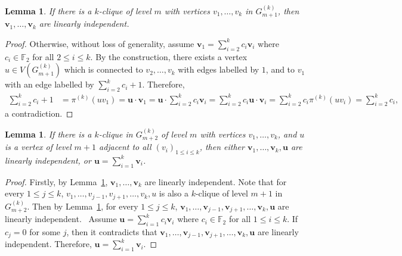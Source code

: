 \documentclass[
final
]{dmtcs-episciences}
\newtheorem{lemma}[theorem]{Lemma}
\begin{document}
\begin{lemma}\label{lemma: clique independence}
    If there is a $k$-clique of level $m$ with vertices $v_1, \ldots, v_k$ in $G^{(k)}_{m+1}$, then $\mathbf{v}_1, \ldots, \mathbf{v}_k$ are linearly independent.
\end{lemma}

\begin{proof}
    Otherwise, without loss of generality, assume $\mathbf{v}_1 = \sum_{i=2}^{k} c_i \mathbf{v}_i$ where $c_i \in \mathbb{F}_2$ for all $ 2 \le i \le k$. By the construction,
    there exists a vertex $u \in V(G^{(k)}_{m+1})$ which is connected to $v_2,\ldots, v_k$ with edges labelled by $1$, and to $v_1$ with an edge labelled by $\sum_{i=2}^{k}c_i + 1$.
    Therefore,
    \begin{equation*}
    \begin{aligned}
       \sum_{i=2}^{k}c_i + 1   & =  \pi^{(k)}(uv_1) = \mathbf{u} \cdot \mathbf{v}_1 = \mathbf{u} \cdot \sum_{i=2}^k c_i \mathbf{v}_i = \sum_{i=2}^k c_i \mathbf{u} \cdot \mathbf{v}_i  = \sum_{i=2}^k c_i\pi^{(k)}(uv_i) = \sum_{i=2}^k c_i,
    \end{aligned}
    \end{equation*}
    a contradiction.
\end{proof}

\begin{lemma}\label{lemma: independent or sum}
    If there is a $k$-clique  in $G^{(k)}_{m+2}$ of level $m$ with vertices $v_1, \ldots, v_k$, and $u$ is a vertex of level $m+1$ adjacent to all ${(v_i)}_{1 \le  i \le k}$,
    then either $\mathbf{v}_1, \ldots, \mathbf{v}_k, \mathbf{u}$ are linearly independent, or $\mathbf{u} = \sum_{i=1}^{k}\mathbf{v}_i$.
\end{lemma}

\begin{proof}
    Firstly, by Lemma~\ref{lemma: clique independence}, $\mathbf{v}_1, \ldots, \mathbf{v}_k$ are linearly independent.
    Note that for every $1 \le j \le k$, $v_1, \ldots, v_{j-1}, v_{j+1}, \ldots, v_k, u$ is also a $k$-clique of level $m+1$ in $G^{(k)}_{m+2}$.
    Then by Lemma~\ref{lemma: clique independence}, for every $1 \le j \le k$, $\mathbf{v}_1, \ldots, \mathbf{v}_{j-1}, \mathbf{v}_{j+1}, \ldots, \mathbf{v}_k, \mathbf{u}$ are linearly independent. \
    Assume $\mathbf{u} = \sum_{i=1}^{k} c_i \mathbf{v}_i$ where $c_i \in \mathbb{F}_2$ for all $1 \le i \le k$. If $c_j = 0$ for some $j$, then it contradicts that $\mathbf{v}_1, \ldots, \mathbf{v}_{j-1}, \mathbf{v}_{j+1}, \ldots, \mathbf{v}_k, \mathbf{u}$ are linearly independent. Therefore, $\mathbf{u} = \sum_{i=1}^{k} \mathbf{v}_i$.
\end{proof}
\end{document}
